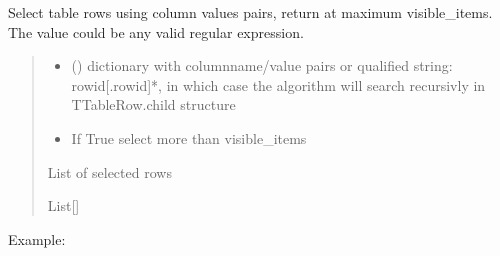 \documentclass[letterpaper,10pt,english]{sphinxmanual}
\begin{document}
\begin{savenotes}
\begin{fulllineitems}
\begin{savenotes}\begin{fulllineitems}
\label{\detokenize{eezz:eezz.table.TTable.do_select}}
\pysigstartsignatures
{}
\pysigstopsignatures
\sphinxAtStartPar
Select table rows using column values pairs, return at maximum visible\_items.
The value could be any valid regular expression.
\begin{quote}\begin{description}
\begin{itemize}
\item {} 
\sphinxAtStartPar
{} (\sphinxstyleliteralemphasis{\sphinxupquote{{[}}}\sphinxstyleliteralemphasis{\sphinxupquote{, }}\sphinxstyleliteralemphasis{\sphinxupquote{{]} or }}) \textendash{} dictionary with column\sphinxhyphen{}name/value pairs         or qualified string: row\sphinxhyphen{}id{[}.row\sphinxhyphen{}id{]}*, in which case the algorithm will search recursivly         in TTableRow.child structure

\item {} 
\sphinxAtStartPar
{} \textendash{} If True select more than visible\_items

\end{itemize}

\sphinxAtStartPar
List of selected rows

\sphinxAtStartPar
List{[}{\hyperref[\detokenize{eezz:eezz.table.TTableRow}]{}}{]}

\end{description}\end{quote}

\sphinxAtStartPar
Example:


\end{fulllineitems}
\end{savenotes}
\end{fulllineitems}
\end{savenotes}
\end{document}
